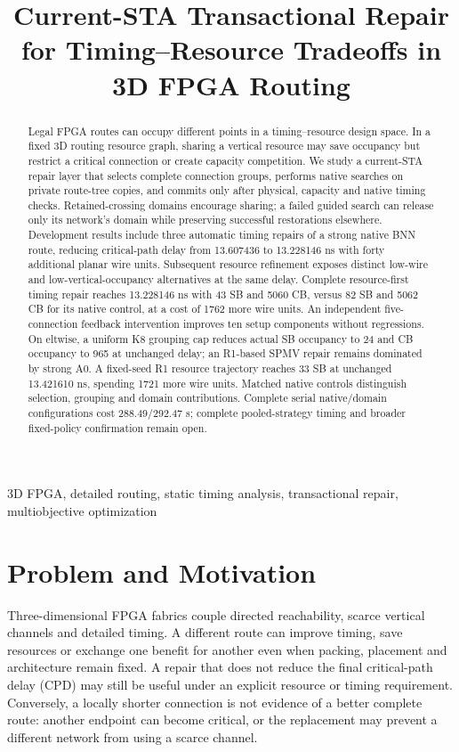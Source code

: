 \documentclass[conference,10pt]{IEEEtran}
\title{Current-STA Transactional Repair for Timing--Resource Tradeoffs in 3D FPGA Routing}
\author{\IEEEauthorblockN{Anonymous development manuscript}}
\begin{document}
\maketitle
\begin{abstract}
Legal FPGA routes can occupy different points in a timing--resource design space. In a fixed 3D routing resource graph, sharing a vertical resource may save occupancy but restrict a critical connection or create capacity competition. We study a current-STA repair layer that selects complete connection groups, performs native searches on private route-tree copies, and commits only after physical, capacity and native timing checks. Retained-crossing domains encourage sharing; a failed guided search can release only its network's domain while preserving successful restorations elsewhere. Development results include three automatic timing repairs of a strong native BNN route, reducing critical-path delay from 13.607436 to 13.228146 ns with forty additional planar wire units. Subsequent resource refinement exposes distinct low-wire and low-vertical-occupancy alternatives at the same delay. Complete resource-first timing repair reaches 13.228146 ns with 43 SB and 5060 CB, versus 82 SB and 5062 CB for its native control, at a cost of 1762 more wire units. An independent five-connection feedback intervention improves ten setup components without regressions. On eltwise, a uniform K8 grouping cap reduces actual SB occupancy to 24 and CB occupancy to 965 at unchanged delay; an R1-based SPMV repair remains dominated by strong A0. A fixed-seed R1 resource trajectory reaches 33 SB at unchanged 13.421610 ns, spending 1721 more wire units. Matched native controls distinguish selection, grouping and domain contributions. Complete serial native/domain configurations cost 288.49/292.47 s; complete pooled-strategy timing and broader fixed-policy confirmation remain open.
\end{abstract}
\begin{IEEEkeywords}
3D FPGA, detailed routing, static timing analysis, transactional repair, multiobjective optimization
\end{IEEEkeywords}

\section{Problem and Motivation}
Three-dimensional FPGA fabrics couple directed reachability, scarce vertical channels and detailed timing. A different route can improve timing, save resources or exchange one benefit for another even when packing, placement and architecture remain fixed. A repair that does not reduce the final critical-path delay (CPD) may still be useful under an explicit resource or timing requirement. Conversely, a locally shorter connection is not evidence of a better complete route: another endpoint can become critical, or the replacement may prevent a different network from using a scarce channel.
\end{document}
